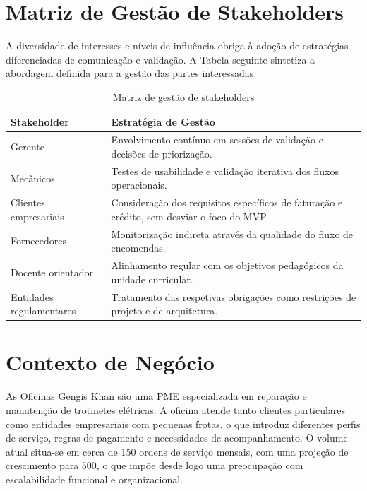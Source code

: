 \documentclass[a4paper,12pt]{scrreprt}
\begin{document}
    \section{Matriz de Gestão de Stakeholders}
        A diversidade de interesses e níveis de influência obriga à adoção de estratégias diferenciadas de comunicação e validação. A Tabela seguinte sintetiza a abordagem definida para a gestão das partes interessadas.

        \begin{table}[H]
            \centering
            \small
            \begin{tabular}{|p{4cm}|p{9.5cm}|}
                \hline
                \rowcolor{gray!20!white}
                \textbf{Stakeholder} & \textbf{Estratégia de Gestão} \\
                \hline
                Gerente & Envolvimento contínuo em sessões de validação e decisões de priorização. \\
                \hline
                Mecânicos & Testes de usabilidade e validação iterativa dos fluxos operacionais. \\
                \hline
                Clientes empresariais & Consideração dos requisitos específicos de faturação e crédito, sem desviar o foco do MVP. \\
                \hline
                Fornecedores & Monitorização indireta através da qualidade do fluxo de encomendas. \\
                \hline
                Docente orientador & Alinhamento regular com os objetivos pedagógicos da unidade curricular. \\
                \hline
                Entidades regulamentares & Tratamento das respetivas obrigações como restrições de projeto e de arquitetura. \\
                \hline
            \end{tabular}
            \caption{Matriz de gestão de stakeholders}
        \end{table}

    \section{Contexto de Negócio}
        As Oficinas Gengis Khan são uma PME especializada em reparação e manutenção de trotinetes elétricas. A oficina atende tanto clientes particulares como entidades empresariais com pequenas frotas, o que introduz diferentes perfis de serviço, regras de pagamento e necessidades de acompanhamento. O volume atual situa-se em cerca de 150 ordens de serviço mensais, com uma projeção de crescimento para 500, o que impõe desde logo uma preocupação com escalabilidade funcional e organizacional.
\end{document}
